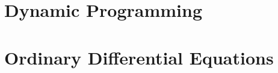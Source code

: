 \documentclass[12pt]{book}
\begin{document}
% 

% 

% 

\appendix

\chapter{Dynamic Programming}
\label{chapter:dp}


\chapter{Ordinary Differential Equations}
\label{chapter:ode}





\end{document}
